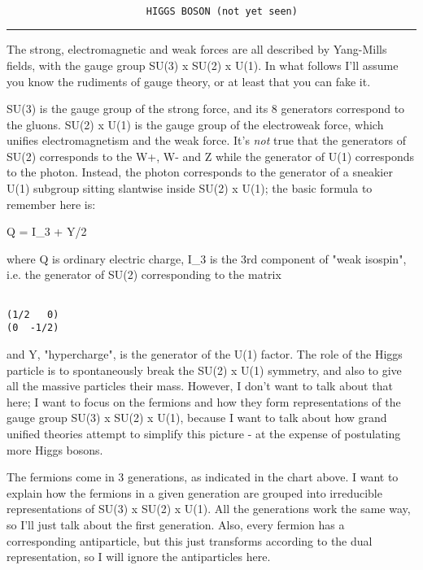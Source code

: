 \begin{verbatim}

                        HIGGS BOSON (not yet seen)

\end{verbatim}
    
\par\noindent\rule{\textwidth}{0.4pt}

The strong, electromagnetic and weak forces are all described by
Yang-Mills fields, with the gauge group SU(3) x SU(2) x U(1).  In what
follows I'll assume you know the rudiments of gauge theory, or at
least that you can fake it.

SU(3) is the gauge group of the strong force, and its 8 generators
correspond to the gluons.  SU(2) x U(1) is the gauge group of the
electroweak force, which unifies electromagnetism and the weak force.
It's \emph{not} true that the generators of SU(2) corresponds to the W+, W-
and Z while the generator of U(1) corresponds to the photon.  Instead,
the photon corresponds to the generator of a sneakier U(1) subgroup
sitting slantwise inside SU(2) x U(1); the basic formula to remember
here is:

Q = I_{3} + Y/2

where Q is ordinary electric charge, I_{3} is the 3rd component of
"weak isospin", i.e. the generator of SU(2) corresponding to the
matrix


\begin{verbatim}

(1/2   0)
(0  -1/2)
\end{verbatim}
    
and Y, "hypercharge", is the generator of the U(1) factor.  The role
of the Higgs particle is to spontaneously break the SU(2) x U(1)
symmetry, and also to give all the massive particles their mass.
However, I don't want to talk about that here; I want to focus on the
fermions and how they form representations of the gauge group SU(3) x
SU(2) x U(1), because I want to talk about how grand unified theories
attempt to simplify this picture - at the expense of postulating more
Higgs bosons.

The fermions come in 3 generations, as indicated in the chart above.
I want to explain how the fermions in a given generation are grouped
into irreducible representations of SU(3) x SU(2) x U(1).  All the
generations work the same way, so I'll just talk about the first
generation.  Also, every fermion has a corresponding antiparticle, but
this just transforms according to the dual representation, so I will
ignore the antiparticles here.


